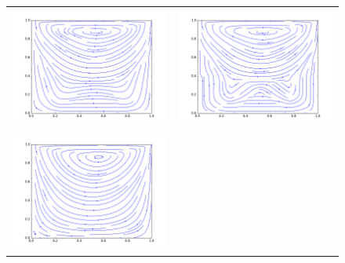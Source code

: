 \begin{figure}
	\centering
	\begin{tabulary}{\linewidth}{c c}
		\includegraphics[width=\figwid]{figs/lid/bingham_100_bgk-5_Bn10_Re100/sl_step-000050000}
		&
		\includegraphics[width=\figwid]{figs/lid/bingham_100_bgk-8_Bn10_Re100/sl_step-000050000}
		\\
		\includegraphics[width=\figwid]{figs/lid/bingham_100_svec-8_Bn10_Re100/sl_step-000050000}

\end{tabulary}
\end{figure}

